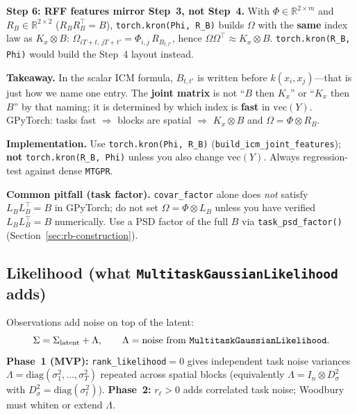 \documentclass[11pt]{article}
\theoremstyle{plain}
\newcommand{\noise}{\sigma^2}
\newcommand{\Sig}{\Sigma}
\newcommand{\Ph}{\Phi}
\newcommand{\Om}{\Omega}
\newcommand{\LB}{L_B}
\newcommand{\RB}{R_B}
\begin{document}
\medskip
\textbf{Step 6: RFF features mirror Step~3, not Step~4.}
With $\Ph \in \mathbb{R}^{2 \times m}$ and $\RB \in \mathbb{R}^{2 \times 2}$ ($\RB\RB^\top = B$),
\texttt{torch.kron(Phi, R\_B)} builds $\Om$ with the \textbf{same} index law as $K_x \otimes B$:
$\Om_{iT+t,\, jT+t'} = \Ph_{i,j}\,\RB_{t,t'}$, hence $\Om\Om^\top \approx K_x \otimes B$.
\texttt{torch.kron(R\_B, Phi)} would build the Step~4 layout instead.

\begin{samebox}
\textbf{Takeaway.} In the scalar ICM formula, $B_{t,t'}$ is written before $k(x_i,x_j)$---that is just
how we name one entry. The \textbf{joint matrix} is not ``$B$ then $K_x$'' or ``$K_x$ then $B$'' by
that naming; it is determined by which index is \textbf{fast} in $\mathrm{vec}(Y)$.
GPyTorch: tasks fast $\Rightarrow$ blocks are spatial $\Rightarrow$ $K_x \otimes B$ and $\Om = \Ph \otimes \RB$.
\end{samebox}

\begin{diffbox}
\textbf{Implementation.} Use \texttt{torch.kron(Phi, R\_B)} (\texttt{build\_icm\_joint\_features});
\textbf{not} \texttt{torch.kron(R\_B, Phi)} unless you also change $\mathrm{vec}(Y)$.
Always regression-test against dense \texttt{MTGPR}.

\textbf{Common pitfall (task factor).} \texttt{covar\_factor} alone does \emph{not} satisfy
$\LB\LB^\top = B$ in GPyTorch; do not set $\Om = \Ph \otimes \LB$ unless you have verified
$\LB\LB^\top = B$ numerically. Use a PSD factor of the full $B$ via
\texttt{task\_psd\_factor()} (Section~\ref{sec:rb-construction}).
\end{diffbox}

\subsection{Likelihood (what \texttt{MultitaskGaussianLikelihood} adds)}

Observations add noise on top of the latent:
\begin{equation}
  \Sig = \Sig_{\mathrm{latent}} + \Lambda,
  \qquad
  \Lambda = \text{noise from \texttt{MultitaskGaussianLikelihood}}.
\end{equation}
\textbf{Phase~1 (MVP):} \texttt{rank\_likelihood}$=0$ gives independent task noise variances
$\Lambda = \mathrm{diag}(\noise_1,\ldots,\noise_T)$ repeated across spatial blocks
(equivalently $\Lambda = I_n \otimes D_\noise$ with $D_\noise = \mathrm{diag}(\noise_t)$).
\textbf{Phase~2:} $r_\ell > 0$ adds correlated task noise; Woodbury must whiten or extend $\Lambda$.
\end{document}
